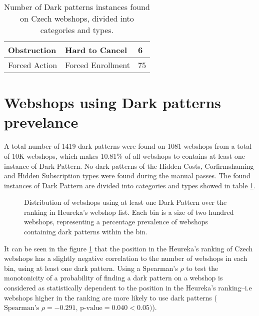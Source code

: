 \begin{table}[h!]
\begin{tabular}{ll|l}
            Obstruction                           & Hard to Cancel                     & 6                                         \\ \hline
            Forced Action                         & Forced Enrollment                  & 75                                        \\ \hline                                       
            \end{tabular}
        \egroup
    \caption{Number of Dark patterns instances found on Czech webshops, divided into categories and types.}
    \label{table:summary-dark-patterns}
\end{table}

\section{Webshops using Dark patterns prevelance}

A total number of 1419 dark patterns were found on 1081 webshops from a total of 10K webshops, which makes 10.81\% of all webshops to contains at least one instance of Dark Pattern. No dark patterns of the Hidden Costs, Corfirmshaming and Hidden Subscription types were found during the manual passes. The found instances of Dark Pattern are divided into categories and types showed in table \ref{table:summary-dark-patterns}.

\begin{figure}
    \begin{center}
        
    \end{center}
    \caption{Distribution of webshops using at least one Dark Pattern over the ranking in Heureka's webshop list. Each bin is a size of two hundred webshops, representing a percentage prevalence of webshops containing dark patterns within the bin.}
    \label{fig:dp-percentage}
\end{figure}

It can be seen in the figure \ref{fig:dp-percentage} that the position in the Heureka's ranking of Czech webshops has a slightly negative correlation to the number of webshops in each bin, using at least one dark pattern. Using a Spearman's $\rho$ to test the monotonicity of a probability of finding a dark pattern on a webshop is considered as statistically dependent to the position in the Heureka's ranking--i.e webshops higher in the ranking are more likely to use dark patterns ($\text{Spearman's }\rho=-0.291$, $\text{p-value}=0.040 < 0.05)$).

